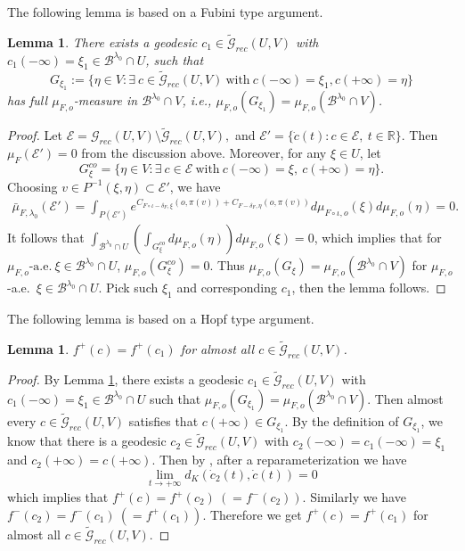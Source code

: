 \documentclass[11pt]{amsart}
\newtheorem{lemma}[theorem]{Lemma}
\theoremstyle{definition}
\newcommand{\BBB}{\mathcal{B}}
\def\d{\delta}   %
\def\l{\lambda}   \def\L{\Lambda}
\def\ae{\text{-a.e.}\ }
\begin{document}
The following lemma is based on a Fubini type argument.
\begin{lemma}\label{Gxi}
There exists a geodesic $c_1\in \mathcal{\widetilde{G}}_{rec}(U,V)$ with $c_1(-\infty)=\xi_1\in  \BBB^{\l_0}\cap U$, such that
$$G_{\xi_1}:= \{\eta \in V : \exists~c\in\mathcal{\widetilde{G}}_{rec}(U,V) ~\mbox{with}~c(-\infty)=\xi_1,  c(+\infty)=\eta\}$$
has full $\mu_{F,o}$-measure in $\BBB^{\l_0}\cap V$, i.e., $\mu_{F,o}(G_{\xi_1})=\mu_{F,o}(\BBB^{\l_0}\cap V)$.
\end{lemma}
\begin{proof}
Let $\mathcal{E}=\mathcal{G}_{rec}(U,V)\setminus\mathcal{\widetilde{G}}_{rec}(U,V),$ and $\mathcal{E}'=\{\dot c(t): c\in\mathcal{E},~t\in\mathbb{R}\}$. Then $\mu_F(\mathcal{E}')=0$ from the discussion above. Moreover, for any $\xi\in U$, let
$$G^{co}_{\xi}= \{\eta \in V :  \exists~c\in\mathcal{E}~\mbox{with}~ c(-\infty)=\xi, ~c(+\infty)=\eta\}.$$
Choosing $v\in P^{-1}(\xi,\eta)\subset \mathcal{E}'$, we have
\begin{equation*}
\begin{aligned}
\bar\mu_{F,\l_0}(\mathcal{E}')=\int_{P(\mathcal{E}')}e^{C_{F\circ \iota-\d_F,\xi}(o, \pi(v))+C_{F-\d_F,\eta}(o, \pi(v))}d\mu_{F\circ \iota,o}(\xi) d\mu_{F,o}(\eta)=0.
\end{aligned}
\end{equation*}
It follows that $\int_{\BBB^{\l_0}\cap U}(\int_{G^{co}_{\xi}}d\mu_{F,o}(\eta) )d\mu_{F,o}(\xi)=0$, which implies that for  $\mu_{F,o} \ae \xi \in \BBB^{\l_0}\cap U$,
$\mu_{F,o}(G^{co}_{\xi})=0$. Thus $\mu_{F,o}(G_{\xi})=\mu_{F,o}(\BBB^{\l_0}\cap V)$ for $\mu_{F,o}$-a.e.~$\xi \in \BBB^{\l_0}\cap U$. Pick such $\xi_1$ and corresponding $c_1$, then the lemma follows.
\end{proof}

The following lemma is based on a Hopf type argument.
\begin{lemma}\label{lem8}
$f^{+}(c)=f^+(c_1)$ for almost all $c\in\mathcal{\widetilde{G}}_{rec}(U,V)$.
\end{lemma}
\begin{proof}
By Lemma \ref{Gxi}, there exists a geodesic $c_1\in \mathcal{\widetilde{G}}_{rec}(U,V)$ with $c_1(-\infty)=\xi_1\in  \BBB^{\l_0}\cap U$ such that $\mu_{F,o}(G_{\xi_1})=\mu_{F,o}(\BBB^{\l_0}\cap V)$. Then almost every $c\in \mathcal{\widetilde{G}}_{rec}(U,V)$ satisfies that $c(+\infty)\in G_{\xi_1}$. By the definition of $G_{\xi_1}$, we know that there is a geodesic $c_2\in \mathcal{\widetilde{G}}_{rec}(U,V)$ with $c_2(-\infty)=c_1(-\infty)=\xi_1$ and $c_2(+\infty)=c(+\infty)$. Then by \cite[Proposition 4.1]{Kn}, after a reparameterization we have 
$$\lim_{t\to +\infty}d_K(\dot c_2(t),\dot c(t))= 0$$
which implies that $f^+(c)=f^+(c_2)~(=f^-(c_2))$. Similarly we have $f^-(c_2)=f^-(c_1)~(=f^+(c_1))$. Therefore we get $f^+(c)=f^+(c_1)$ for almost all $c\in\mathcal{\widetilde{G}}_{rec}(U,V)$.
\end{proof}
\end{document}

